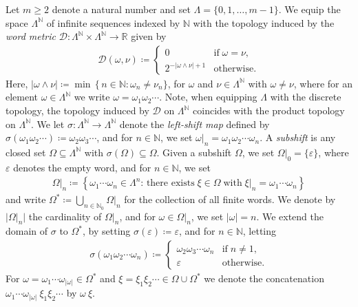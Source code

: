 \documentclass[a4paper,reqno,10pt]{amsart}
\begin{document}
Let $m \geq 2$ denote a natural number and set $\Lambda = \{0, 1, \ldots, m-1\}$. We equip the space $\Lambda^\mathbb{N}$ of infinite sequences indexed by $\mathbb{N}$ with the topology induced by the \textsl{word metric} $\mathscr{D} \colon \Lambda^\mathbb{N} \times \Lambda^\mathbb{N} \to \mathbb{R}$ given by
    \begin{align*}
    \mathscr{D}(\omega, \nu) \coloneqq
        \begin{cases}
        0 & \text{if} \; \omega = \nu,\\
        2^{- \lvert\omega \wedge \nu\rvert + 1} & \text{otherwise}.
        \end{cases}
    \end{align*}
Here, $\rvert \omega \wedge \nu \lvert \coloneqq \min \, \{ \, n \in \mathbb{N} \colon \omega_{n} \neq \nu_n \}$, for $\omega$ and $\nu \in \Lambda^{\mathbb{N}}$ with $\omega \neq \nu$, where for an element $\omega \in \Lambda^{\mathbb{N}}$ we write $\omega=\omega_1\omega_2\cdots$. Note, when equipping $\Lambda$ with the discrete topology, the topology induced by $\mathscr{D}$ on $\Lambda^{\mathbb{N}}$ coincides with the product topology on $\Lambda^{\mathbb{N}}$. We let $\sigma \colon \Lambda^{\mathbb{N}} \to \Lambda^{\mathbb{N}}$ denote the \textsl{left-shift map} defined by $\sigma(\omega_{1} \omega_{2} \cdots) \coloneqq \omega_{2} \omega_{3} \cdots$, and for $n \in \mathbb{N}$, we set $\omega\rvert_{n} = \omega_{1} \omega_{2} \cdots \omega_{n}$. A \textsl{subshift} is any closed set $\Omega \subseteq \Lambda^\mathbb{N}$ with $\sigma(\Omega) \subseteq \Omega$.  Given a subshift $\Omega$, we set $\Omega\vert_{0} = \{ \varepsilon\}$, where $\varepsilon$ denotes the empty word, and for $n \in \mathbb{N}$, we set
    \begin{align*}
    \Omega\lvert_{n} \coloneqq \left\{ \omega_{1} \cdots \omega_{n} \in \Lambda^{n} \colon \,\text{there exists} \; \xi  \in \Omega \; \text{with} \; \xi|_n = \omega_{1} \cdots \omega_{n} \right\}
    \end{align*}
and write $\Omega^{*} \coloneqq \bigcup_{n \in \mathbb{N}_{0}} \Omega\lvert_{n}$ for the collection of all finite words.  We denote by $\lvert \Omega\vert_{n} \rvert$ the cardinality of $\Omega\vert_{n}$, and for $\omega \in \Omega\vert_{n}$, we set $\lvert \omega \rvert = n$.  We extend the domain of $\sigma$ to $\Omega^{*}$, by setting $\sigma(\varepsilon) \coloneqq \varepsilon$, and for $n \in \mathbb{N}$, letting 
    \begin{align*}
        \sigma(\omega_{1} \omega_{2} \cdots \omega_{n}) \coloneqq 
            \begin{cases}
                \omega_{2} \omega_{3} \cdots \omega_{n} & \text{if} \; n \neq 1,\\
                \varepsilon & \text{otherwise}.
            \end{cases}
    \end{align*}
For $\omega = \omega_{1} \cdots \omega_{\lvert \omega \rvert} \in \Omega^{*}$ and $\xi = \xi_{1} \xi_{2} \cdots \in \Omega \cup \Omega^{*}$ we denote the concatenation $\omega_{1} \cdots \omega_{\lvert \omega \rvert} \ \xi_{1} \xi_{2} \cdots$ by $\omega \ \xi$.
\end{document}
